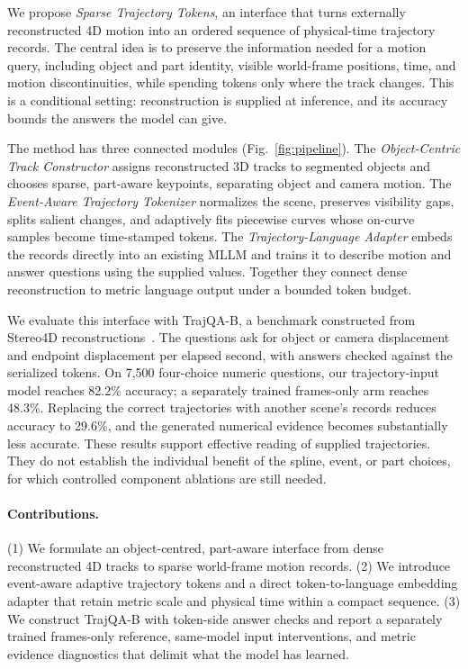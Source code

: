 We propose \emph{Sparse Trajectory Tokens}, an interface that turns externally reconstructed 4D motion into an ordered sequence of physical-time trajectory records. The central idea is to preserve the information needed for a motion query, including object and part identity, visible world-frame positions, time, and motion discontinuities, while spending tokens only where the track changes. This is a conditional setting: reconstruction is supplied at inference, and its accuracy bounds the answers the model can give.

The method has three connected modules (Fig.~\ref{fig:pipeline}). The \emph{Object-Centric Track Constructor} assigns reconstructed 3D tracks to segmented objects and chooses sparse, part-aware keypoints, separating object and camera motion. The \emph{Event-Aware Trajectory Tokenizer} normalizes the scene, preserves visibility gaps, splits salient changes, and adaptively fits piecewise curves whose on-curve samples become time-stamped tokens. The \emph{Trajectory-Language Adapter} embeds the records directly into an existing MLLM and trains it to describe motion and answer questions using the supplied values. Together they connect dense reconstruction to metric language output under a bounded token budget.

We evaluate this interface with TrajQA-B, a benchmark constructed from Stereo4D reconstructions~\citep{jinStereo4DLearningHow2025}. The questions ask for object or camera displacement and endpoint displacement per elapsed second, with answers checked against the serialized tokens. On 7,500 four-choice numeric questions, our trajectory-input model reaches 82.2\% accuracy; a separately trained frames-only arm reaches 48.3\%. Replacing the correct trajectories with another scene's records reduces accuracy to 29.6\%, and the generated numerical evidence becomes substantially less accurate. These results support effective reading of supplied trajectories. They do not establish the individual benefit of the spline, event, or part choices, for which controlled component ablations are still needed.

\paragraph{Contributions.} (1) We formulate an object-centred, part-aware interface from dense reconstructed 4D tracks to sparse world-frame motion records. (2) We introduce event-aware adaptive trajectory tokens and a direct token-to-language embedding adapter that retain metric scale and physical time within a compact sequence. (3) We construct TrajQA-B with token-side answer checks and report a separately trained frames-only reference, same-model input interventions, and metric evidence diagnostics that delimit what the model has learned.
